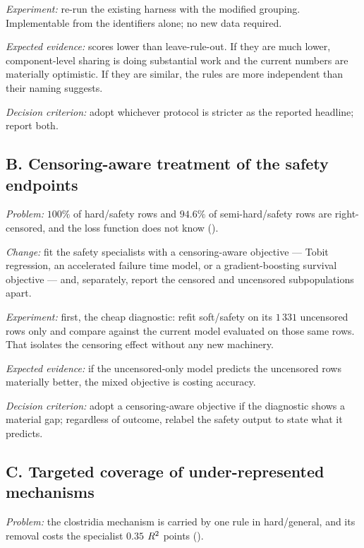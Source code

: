 \emph{Experiment:} re-run the existing harness with the modified grouping.
Implementable from the identifiers alone; no new data required.

\emph{Expected evidence:} scores lower than leave-rule-out. If they are
much lower, component-level sharing is doing substantial work and the
current numbers are materially optimistic. If they are similar, the rules
are more independent than their naming suggests.

\emph{Decision criterion:} adopt whichever protocol is stricter as the
reported headline; report both.

\subsection{B. Censoring-aware treatment of the safety endpoints}

\emph{Problem:} $100\%$ of hard/safety rows and $94.6\%$ of semi-hard/safety
rows are right-censored, and the loss function does not know
().

\emph{Change:} fit the safety specialists with a censoring-aware objective
--- Tobit regression, an accelerated failure time model, or a
gradient-boosting survival objective --- and, separately, report the
censored and uncensored subpopulations apart.

\emph{Experiment:} first, the cheap diagnostic: refit soft/safety on its
$1\,331$ uncensored rows only and compare against the current model
evaluated on those same rows. That isolates the censoring effect without
any new machinery.

\emph{Expected evidence:} if the uncensored-only model predicts the
uncensored rows materially better, the mixed objective is costing
accuracy.

\emph{Decision criterion:} adopt a censoring-aware objective if the
diagnostic shows a material gap; regardless of outcome, relabel the safety
output to state what it predicts.

\subsection{C. Targeted coverage of under-represented mechanisms}

\emph{Problem:} the clostridia mechanism is carried by one rule in
hard/general, and its removal costs the specialist $0.35$ $R^2$ points
().


